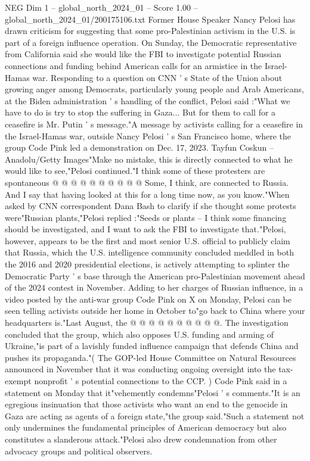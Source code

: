 \begin{textsample}{NEG Dim 1 – global\_north\_2024\_01 – Score 1.00 – global\_north\_2024\_01/200175106.txt}  \label{ex:f1_neg_290}
Former House Speaker Nancy Pelosi has drawn criticism for suggesting that some pro-Palestinian activism in the U.S. is part of a foreign influence operation.
On Sunday, the Democratic representative from California said she would like the FBI to investigate potential Russian connections and funding behind American calls for an armistice in the Israel-Hamas war.
Responding to a question on CNN ' s State of the Union about growing anger among Democrats, particularly young people and Arab Americans, at the Biden administration ' s handling of the conflict, Pelosi said :"What we have to do is try to stop the suffering in Gaza...
But for them to call for a ceasefire is Mr.
Putin ' s message."A message by activists calling for a ceasefire in the Israel-Hamas war, outside Nancy Pelosi ' s San Francisco home, where the group Code Pink led a demonstration on Dec. 17, 2023.
Tayfun Coskun -- Anadolu/Getty Images"Make no mistake, this is directly connected to what he would like to see,"Pelosi continued."I think some of these protesters are spontaneous @ @ @ @ @ @ @ @ @ @ Some, I think, are connected to Russia.
And I say that having looked at this for a long time now, as you know."When asked by CNN correspondent Dana Bash to clarify if she thought some protests were"Russian plants,"Pelosi replied :"Seeds or plants -- I think some financing should be investigated, and I want to ask the FBI to investigate that."Pelosi, however, appears to be the first and most senior U.S. official to publicly claim that Russia, which the U.S. intelligence community concluded meddled in both the 2016 and 2020 presidential elections, is actively attempting to splinter the Democratic Party ' s base through the American pro-Palestinian movement ahead of the 2024 contest in November.
Adding to her charges of Russian influence, in a video posted by the anti-war group Code Pink on X on Monday, Pelosi can be seen telling activists outside her home in October to"go back to China where your headquarters is."Last August, the @ @ @ @ @ @ @ @ @ @.
The investigation concluded that the group, which also opposes U.S. funding and arming of Ukraine,"is part of a lavishly funded influence campaign that defends China and pushes its propaganda."( The GOP-led House Committee on Natural Resources announced in November that it was conducting ongoing oversight into the tax-exempt nonprofit ' s potential connections to the CCP. ) Code Pink said in a statement on Monday that it"vehemently condemns"Pelosi ' s comments."It is an egregious insinuation that those activists who want an end to the genocide in Gaza are acting as agents of a foreign state,"the group said."Such a statement not only undermines the fundamental principles of American democracy but also constitutes a slanderous attack."Pelosi also drew condemnation from other advocacy groups and political observers.

\end{textsample}
